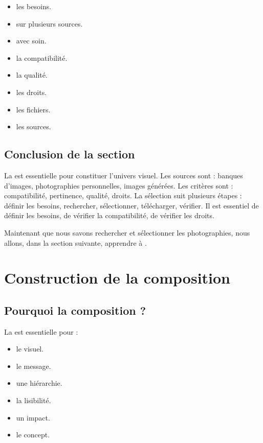 \begin{itemize}
    \item {} les besoins.
    \item {} sur plusieurs sources.
    \item {} avec soin.
    \item {} la compatibilité.
    \item {} la qualité.
    \item {} les droits.
    \item {} les fichiers.
    \item {} les sources.
\end{itemize}

\subsection*{Conclusion de la section}

La  est essentielle pour constituer l'univers visuel. Les sources sont : banques d'images, photographies personnelles, images générées. Les critères sont : compatibilité, pertinence, qualité, droits. La sélection suit plusieurs étapes : définir les besoins, rechercher, sélectionner, télécharger, vérifier. Il est essentiel de définir les besoins, de vérifier la compatibilité, de vérifier les droits.

Maintenant que nous savons rechercher et sélectionner les photographies, nous allons, dans la section suivante, apprendre à .

\section{Construction de la composition}

\subsection{Pourquoi la composition ?}

La  est essentielle pour :

\begin{itemize}
    \item {} le visuel.
    \item {} le message.
    \item {} une hiérarchie.
    \item {} la lisibilité.
    \item {} un impact.
    \item {} le concept.
\end{itemize}

